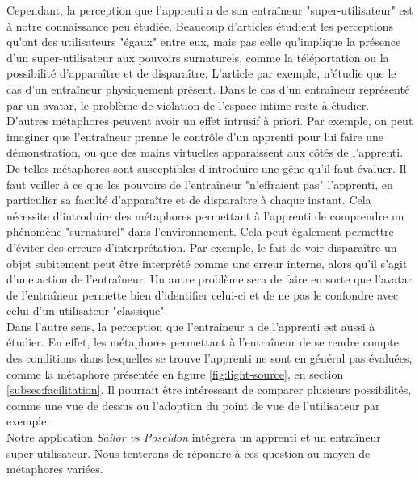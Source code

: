 \documentclass[11pt]{article}
\begin{document}
Cependant, la perception que l'apprenti a de son entraîneur "super-utilisateur" est à notre connaissance peu étudiée. Beaucoup d'articles étudient les perceptions qu'ont des utilisateurs "égaux" entre eux, mais pas celle qu'implique la présence d'un super-utilisateur aux pouvoirs surnaturels, comme la téléportation ou la possibilité d'apparaître et de disparaître. L'article \cite{show-through} par exemple, n'étudie que le cas d'un entraîneur physiquement présent. Dans le cas d'un entraîneur représenté par un avatar, le problème de violation de l'espace intime reste à étudier. D'autres métaphores peuvent avoir un effet intrusif à priori. Par exemple, on peut imaginer que l'entraîneur prenne le contrôle d'un apprenti pour lui faire une démonstration, ou que des mains virtuelles apparaissent aux côtés de l'apprenti. De telles métaphores sont susceptibles d'introduire une gêne qu'il faut évaluer. Il faut veiller à ce que les pouvoirs de l'entraîneur "n'effraient pas" l'apprenti, en particulier sa faculté d'apparaître et de disparaître à chaque instant. Cela nécessite d'introduire des métaphores permettant à l'apprenti de comprendre un phénomène "surnaturel" dans l'environnement. Cela peut également permettre d'éviter des erreurs d'interprétation. Par exemple, le fait de voir disparaître un objet subitement peut être interprété comme une erreur interne, alors qu'il s'agit d'une action de l'entraîneur. Un autre problème sera de faire en sorte que l'avatar de l'entraîneur permette bien d'identifier celui-ci et de ne pas le confondre avec celui d'un utilisateur "classique".
\\

Dans l'autre sens, la perception que l'entraîneur a de l'apprenti est aussi à étudier. En effet, les métaphores permettant à l'entraîneur de se rendre compte des conditions dans lesquelles se trouve l'apprenti ne sont en général pas évaluées, comme la métaphore présentée en figure \ref{fig:light-source}, en section \ref{subsec:facilitation}. Il pourrait être intéressant de comparer plusieurs possibilités, comme une vue de dessus ou l'adoption du point de vue de l'utilisateur par exemple.
\\

Notre application \textit{Sailor vs Poseidon} intégrera un apprenti et un entraîneur super-utilisateur. Nous tenterons de répondre à ces question au moyen de métaphores variées.


 
\end{document}
